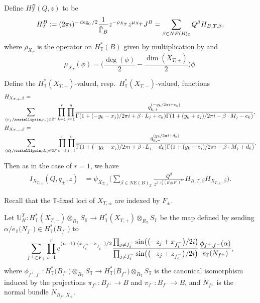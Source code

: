 \documentclass[11pt]{article}
\numberwithin{equation}{section}
\numberwithin{equation}{section}
\newcommand{\ZZ}{\mathbb{Z}}
\newcommand{\UU}{\mathbb{U}}
\newcommand{\torus}{\mathbb{T}}
\newcommand{\F}{F}
\newcommand{\E}{E}
\newcommand{\MB}{M}
\newcommand{\LB}{L}
\newcommand{\z}{z}
\newcommand{\x}{x}
\newcommand{\y}{y}
\begin{document}
Define $H^B_T(Q ,z)$ to be
\begin{align*} H^B_T := (2 \pi {\rm i})^{-\deg_0/2}\frac{1}{\hat \Gamma_B} z^{- \rho_{X_T}} z^{\mu_{X_T}} J^B
 =
\sum_{\beta \in NE(B)_\ZZ} Q^\beta H_{B, T, \beta},\end{align*}
where $\rho_{X_T}$ is the operator on $H^*_\torus(B)$ given by multiplication by \smash{$c_1^\torus\bigl(TB \oplus \bigl(E \oplus F^\vee\bigr)^{\oplus r}\bigr)$} and
\[
\mu_{X_T}(\phi) = \biggl( \frac{\deg(\phi)}{2} -\frac{ \dim(X_{T, \pm})}{2} \biggr) \phi.
\]

Define the $H^*_\torus(X_{T,+})$-valued, resp.\ $H^*_\torus(X_{T,-})$-valued, functions
\begin{align*}
&H_{X_{T, +}, \beta} =\\ &
\sum_{(e_1, \dots, e_r) \in \ZZ^r} \prod_{k=1}^r\prod_{j=1}^n \!\frac{q_{k, +}^{(-\y_k/2 \pi {\rm i} + e_k)}}
 {\Gamma(1+(-\y_k-\x_j)/2 \pi {\rm i}+\beta\cdot \LB_j+e_k)\Gamma(1+(\y_k+\z_j)/2 \pi {\rm i}-\beta\cdot \MB_j-e_k)},
\\
&H_{X_{T, -}, \beta} = \\ & \sum_{(d_1, \dots, d_r) \in \ZZ^r} \prod_{k=1}^r \prod_{j=1}^n\!\frac{q_{k, -}^{(\y_k/2 \pi {\rm i} + d_k)} }{\Gamma(1+(-\y_k-\x_j)/2 \pi {\rm i}+\beta\cdot \LB_j - d_k)\Gamma(1+(\y_k+\z_j)/2 \pi {\rm i}-\beta\cdot \MB_j + d_k)}.
\end{align*}

Then as in the case of $r=1$, we have
\begin{align*}%
I_{X_{T, \pm}}(Q, q_\pm, z) &{}= \psi_{X_{T,\pm}} \biggl( \sum_{\beta \in NE(B)_\ZZ} \frac{Q^\beta}{z^{\beta \cdot c_1^\torus(\E \oplus \F^\vee)^{\oplus r}}} H_{B, T, \beta} H_{X_{T, \pm}, \beta} \biggr).
\end{align*}



Recall that the $\torus$-fixed loci of $X_{T, \pm}$ are indexed by $F_\pm$.

Let $\UU_H^T\colon H^*_\torus(X_{T,-})\otimes_{R_\torus} S_\torus \to H^*_\torus(X_{T,+})\otimes_{R_\torus} S_\torus$ be the map defined by sending
$\alpha/e_\torus\bigl(N_{f^-}\bigr) \in H^*_\torus\bigl(B_{f^-}\bigr)$ to
\[
\sum_{f^+ \in F_+} \prod_{i=1}^r {\rm e}^{ (n-1)\cdot ( \x_{f^+_i}- \z_{f^-_i})/2 }\frac{ \prod_{j\neq {f^-_i}} \sin\bigl( \bigl(-\z_j+\x_{f^+_i}\bigr)/2 {\rm i}\bigr) }{\prod_{j \neq {f^-_i}}\sin\bigl(\bigl(-\z_j + \z_{f^-_i}\bigr)/2 {\rm i}\bigr)} \frac{\phi_{f^+, f^-}(\alpha)}{e_\torus(N_{f^+})},
\]
where $\phi_{f^+, f^-}\colon H^*_\torus\bigl(B_{f^-}\bigr)\otimes_{R_\torus} S_\torus \to H^*_\torus\bigl(B_{f^+}\bigr)\otimes_{R_\torus} S_\torus$ is the canonical isomorphism induced by the projections $\pi_{f^+}\colon B_{f^+} \to B$ and $\pi_{f^-}\colon B_{f^-} \to B$, and $N_{f^\pm}$ is the normal bundle $N_{B_{f^\pm}|X_\pm}$.
\end{document}
